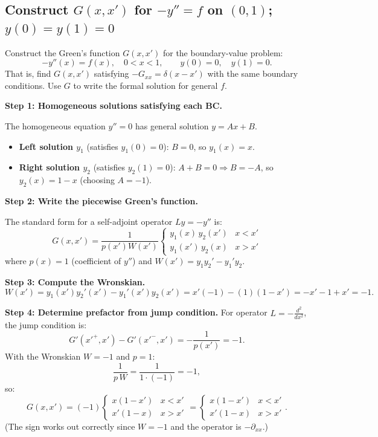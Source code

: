 \documentclass[a4paper,11pt]{article} %
\begin{document}
\newpage
\subsection{\texorpdfstring{Construct $G(x,x')$ for $-y''=f$ on $(0,1)$; $y(0)=y(1)=0$}{Standard 1D Green's function: piecewise linear; $G(x,x')=x_<(1-x_>)$}}

\begin{problembox}
Construct the Green's function $G(x, x')$ for the boundary-value problem:
$$-y''(x) = f(x), \quad 0 < x < 1, \qquad y(0) = 0, \quad y(1) = 0.$$
That is, find $G(x,x')$ satisfying $-G_{xx} = \delta(x-x')$ with the same boundary conditions.
Use $G$ to write the formal solution for general $f$.
\end{problembox}

\textbf{Step 1: Homogeneous solutions satisfying each BC.}

The homogeneous equation $y'' = 0$ has general solution $y = Ax + B$.

\begin{itemize}
    \item \textbf{Left solution $y_1$} (satisfies $y_1(0)=0$): $B=0$, so $y_1(x) = x$.
    \item \textbf{Right solution $y_2$} (satisfies $y_2(1)=0$): $A + B = 0 \Rightarrow B = -A$, so $y_2(x) = 1-x$ (choosing $A=-1$).
\end{itemize}

\textbf{Step 2: Write the piecewise Green's function.}

The standard form for a self-adjoint operator $Ly = -y''$ is:
\[
    G(x,x') = \frac{1}{p(x') W(x')} \begin{cases} y_1(x)\,y_2(x') & x < x' \\ y_1(x')\,y_2(x) & x > x' \end{cases}
\]
where $p(x) = 1$ (coefficient of $y''$) and $W(x') = y_1 y_2' - y_1' y_2$.

\textbf{Step 3: Compute the Wronskian.}
\[
    W(x') = y_1(x') y_2'(x') - y_1'(x') y_2(x')
    = x'(-1) - (1)(1-x') = -x' - 1 + x' = -1.
\]

\textbf{Step 4: Determine prefactor from jump condition.}
For operator $L = -\frac{d^2}{dx^2}$, the jump condition is:
\[
    G'(x'^+,x') - G'(x'^-,x') = -\frac{1}{p(x')} = -1.
\]
With the Wronskian $W = -1$ and $p = 1$:
\[
    \frac{1}{p\,W} = \frac{1}{1\cdot(-1)} = -1,
\]
so:
\[
    G(x,x') = (-1)\begin{cases} x(1-x') & x < x' \\ x'(1-x) & x > x' \end{cases}
    = \begin{cases} x(1-x') & x < x' \\ x'(1-x) & x > x' \end{cases}.
\]
(The sign works out correctly since $W = -1$ and the operator is $-\partial_{xx}$.)
\end{document}
